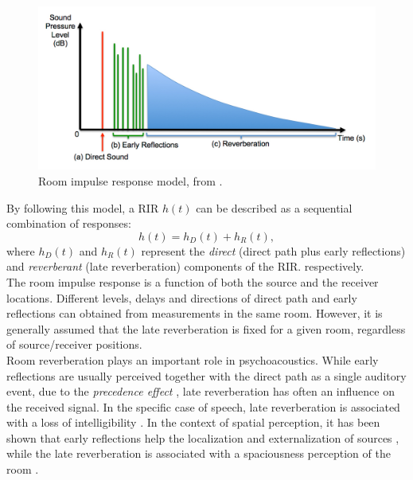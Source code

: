 \begin{figure}[htbp]
	\begin{center}
	\includegraphics[width=\textwidth]{Figures/Introduction/Acoustic_room_impulse_response.jpg}
	\caption{Room impulse response model, from \cite{murphy2017acoustic}.}
	\label{fig:rir}
	\end{center}
\end{figure}

By following this model, a RIR $h(t)$ can be described as a sequential combination of responses:
\begin{equation}
	h(t) = h_D(t) + h_R(t),
\label{eq:directreverberant}
\end{equation}
where $h_D(t)$ and $h_R(t)$ represent the \textit{direct} (direct path plus early reflections) and \textit{reverberant} (late reverberation) components of the RIR. respectively.\\


The room impulse response is a function of both the source and the receiver locations. Different levels, delays and directions of direct path and early reflections can obtained from measurements in the same room. However, it is generally assumed that the late reverberation is fixed for a given room, regardless of source/receiver positions. \\

Room reverberation plays an important role in psychoacoustics. While early reflections are usually perceived together with the direct path as a single auditory event, due to the \textit{precedence effect} \cite{haas1972influence}, late reverberation has often an influence on the received signal. In the specific case of speech, late reverberation is associated with a loss of intelligibility \cite{braun2018speech}.
In the context of spatial perception, it has been shown that early reflections help the localization and externalization of sources \cite{rudrich2019improving}, while the late reverberation is associated with a spaciousness perception of the room \cite{begault20003}. \\


